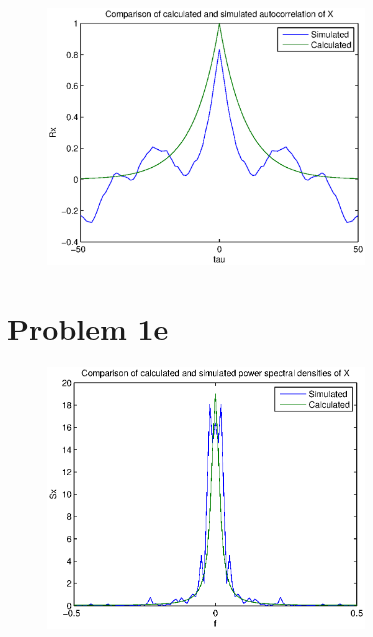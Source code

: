 	
	
	\begin{figure}[h]
	  \centering
	  \includegraphics[width=0.75\textwidth]{img/Oppgave1d}
	\end{figure}
  
  \section{Problem 1e}
  
	
	
	\begin{figure}[h]
	  \centering
	  \includegraphics[width=0.75\textwidth]{img/Oppgave1e}
	\end{figure}